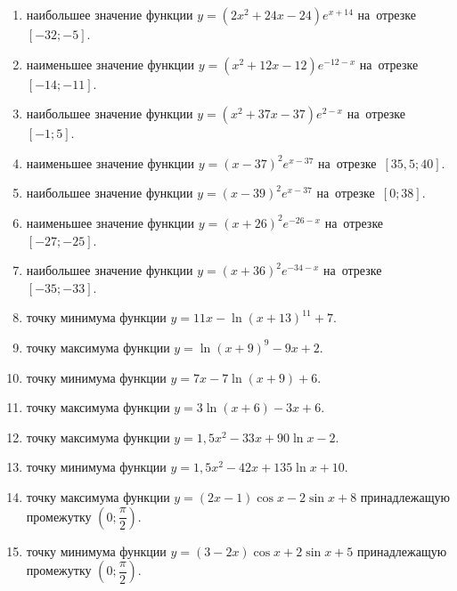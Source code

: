 \documentclass[a4paper,10pt]{article}
\begin{document}
\begin{enumerate}
\item {} наибольшее значение функции $y=\left(2x^2 +24x -24\right)e^{x+14}$ на~отрезке~$\left[-32;-5\right]$.

\item {} наименьшее значение функции $y=\left(x^2 +12x -12\right)e^{-12-x}$ на~отрезке~$\left[-14;-11\right]$.

\item {} наибольшее значение функции $y=\left(x^2 +37x -37\right)e^{2-x}$ на~отрезке~$\left[-1;5\right]$.

\item {} наименьшее значение функции $y=\left(x-37\right)^2e^{x-37}$ на~отрезке~$\left[35,5;40\right]$.

\item {} наибольшее значение функции $y=\left(x-39\right)^2e^{x-37}$ на~отрезке~$\left[0;38\right]$.

\item {} наименьшее значение функции $y=\left(x+26\right)^2e^{-26-x}$ на~отрезке~$\left[-27;-25\right]$.

\item {} наибольшее значение функции $y=\left(x+36\right)^2e^{-34-x}$ на~отрезке~$\left[-35;-33\right]$.

\item {} точку минимума функции $y=11x-\ln\left(x+13\right)^{11}+7$.

\item {} точку максимума функции $y=\ln\left(x+9\right)^{9}-9x+2$.

\item {} точку минимума функции $y=7x-7\ln\left(x+9\right)+6$.

\item {} точку максимума функции $y=3\ln\left(x+6\right)-3x+6$.

\item {} точку максимума функции $y=1,5x^2-33x+90\ln x -2$.

\item {} точку минимума функции $y=1,5x^2-42x+135\ln x +10$.

\item {} точку максимума функции $y=\left(2x-1\right)\cos x -2\sin x+8$
принадлежащую промежутку $\left(0;\dfrac{\pi}{2}\right)$.

\item {} точку минимума функции $y=\left(3-2x\right)\cos x +2\sin x+5$
принадлежащую промежутку $\left(0;\dfrac{\pi}{2}\right)$.


\end{enumerate}
\end{document}

